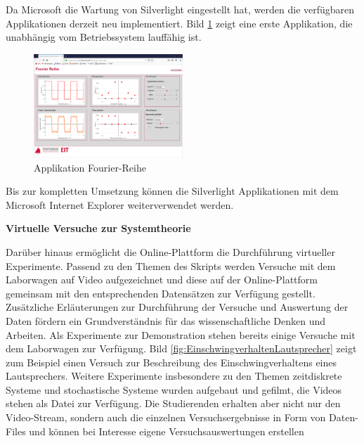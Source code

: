 \noindent Da Microsoft die Wartung von Silverlight eingestellt hat, werden die verfügbaren Applikationen derzeit neu implementiert. Bild \ref{fig:Fourier-Reihe} zeigt eine erste Applikation, die unabhängig vom Betriebssystem lauffähig ist.

\begin{figure}[H]
  \centerline{\includegraphics[width=0.5\textwidth]{Einleitung/Bilder/image3}}
  \caption{Applikation Fourier-Reihe}
  \label{fig:Fourier-Reihe}
\end{figure}

\noindent Bis zur kompletten Umsetzung können die Silverlight Applikationen mit dem Microsoft Internet Explorer weiterverwendet werden.\bigskip

{\selectfont
\noindent\textbf{Virtuelle Versuche zur Systemtheorie}} \smallskip

\noindent Darüber hinaus ermöglicht die Online-Plattform die Durchführung virtueller Experimente. Passend zu den Themen des Skripts werden Versuche mit dem Laborwagen auf Video aufgezeichnet und diese auf der Online-Plattform gemeinsam mit den entsprechenden Datensätzen zur Verfügung gestellt. Zusätzliche Erläuterungen zur Durchführung der Versuche und Auswertung der Daten fördern ein Grundverständnis für das wissenschaftliche Denken und Arbeiten. \newline
Als Experimente zur Demonstration stehen bereits einige Versuche mit dem Laborwagen zur Verfügung. Bild \ref{fig:EinschwingverhaltenLautsprecher} zeigt zum Beispiel einen Versuch zur Beschreibung des Einschwingverhaltens eines Lautsprechers. Weitere Experimente insbesondere zu den Themen zeitdiskrete Systeme und stochastische Systeme wurden aufgebaut und gefilmt, die Videos stehen als Datei zur Verfügung. Die Studierenden erhalten aber nicht nur den Video-Stream, sondern auch die einzelnen Versuchsergebnisse in Form von Daten-Files und können bei Interesse eigene Versuchsauswertungen erstellen


